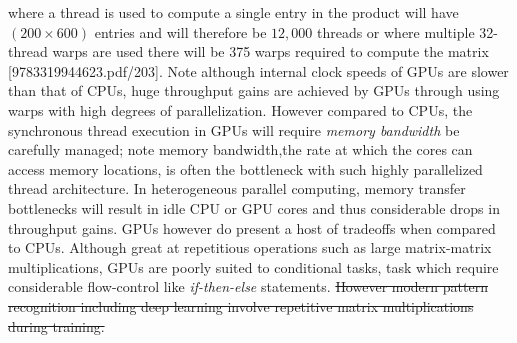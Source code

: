 \documentclass[10pt]{article}[draft]
\begin{document}
where a thread is used to compute a single entry in the product will have $(200 \times 600)$ entries and  will therefore be $12,000$ threads or where multiple 32-thread warps are used there will be 375 warps required to compute the matrix [9783319944623.pdf/203].  Note although internal clock speeds of GPUs are  slower than that of CPUs, huge throughput gains are achieved by GPUs through using warps with high degrees of parallelization. However compared to CPUs, the synchronous thread execution in GPUs will require \emph{memory bandwidth}  be carefully managed; note memory bandwidth,the rate at which the cores can access memory locations, is often the bottleneck with such highly parallelized thread architecture. In heterogeneous parallel computing, memory transfer bottlenecks will result in  idle CPU or GPU cores and thus considerable drops in throughput gains. GPUs however do present a host of tradeoffs when compared to CPUs. Although great at repetitious operations such as large matrix-matrix multiplications, GPUs are poorly suited to conditional tasks, task which require considerable flow-control like \emph{if-then-else} statements. \st{However modern pattern recognition including deep learning involve repetitive matrix multiplications during training.}
\end{document}

